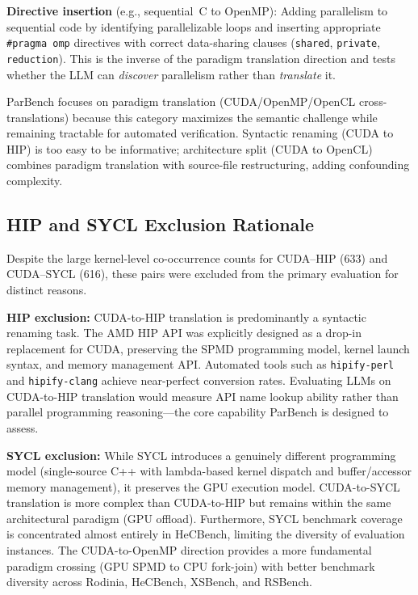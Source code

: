 \textbf{Directive insertion} (e.g., sequential~C to OpenMP): Adding parallelism
to sequential code by identifying parallelizable loops and inserting appropriate
\texttt{\#pragma omp} directives with correct data-sharing clauses
(\texttt{shared}, \texttt{private}, \texttt{reduction}). This is the inverse of
the paradigm translation direction and tests whether the LLM can \emph{discover}
parallelism rather than \emph{translate} it.

ParBench focuses on paradigm translation (CUDA/OpenMP/OpenCL
cross-translations) because this category maximizes the semantic challenge while
remaining tractable for automated verification. Syntactic renaming (CUDA to HIP)
is too easy to be informative; architecture split (CUDA to OpenCL) combines
paradigm translation with source-file restructuring, adding confounding
complexity.

\subsection{HIP and SYCL Exclusion Rationale}
\label{sec:appendix-a3}

Despite the large kernel-level co-occurrence counts for CUDA--HIP (633) and
CUDA--SYCL (616), these pairs were excluded from the primary evaluation for
distinct reasons.

\textbf{HIP exclusion:} CUDA-to-HIP translation is predominantly a syntactic
renaming task. The AMD HIP API was explicitly designed as a drop-in replacement
for CUDA, preserving the SPMD programming model, kernel launch syntax, and
memory management API. Automated tools such as \texttt{hipify-perl} and
\texttt{hipify-clang} achieve near-perfect conversion rates. Evaluating LLMs on
CUDA-to-HIP translation would measure API name lookup ability rather than
parallel programming reasoning---the core capability ParBench is designed to
assess.

\textbf{SYCL exclusion:} While SYCL introduces a genuinely different programming
model (single-source C++ with lambda-based kernel dispatch and buffer/accessor
memory management), it preserves the GPU execution model. CUDA-to-SYCL
translation is more complex than CUDA-to-HIP but remains within the same
architectural paradigm (GPU offload). Furthermore, SYCL benchmark coverage is
concentrated almost entirely in HeCBench, limiting the diversity of evaluation
instances. The CUDA-to-OpenMP direction provides a more fundamental paradigm
crossing (GPU SPMD to CPU fork-join) with better benchmark diversity across
Rodinia, HeCBench, XSBench, and RSBench.

